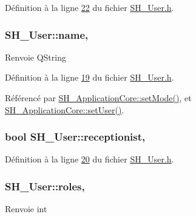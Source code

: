Définition à la ligne \hyperlink{SH__User_8h_source_l00022}{22} du fichier \hyperlink{SH__User_8h_source}{S\-H\-\_\-\-User.\-h}.

\hypertarget{classSH__User_ae32b20d52e62ec32c1f335006f52214e}{
\subsubsection[{name}]{\setlength{\rightskip}{0pt plus 5cm}S\-H\-\_\-\-User\-::name\hspace{0.3cm}{\ttfamily [read]}, {\ttfamily [inherited]}}}\label{classSH__User_ae32b20d52e62ec32c1f335006f52214e}
\begin{DoxyReturn}{Renvoie}
Q\-String 
\end{DoxyReturn}


Définition à la ligne \hyperlink{SH__User_8h_source_l00019}{19} du fichier \hyperlink{SH__User_8h_source}{S\-H\-\_\-\-User.\-h}.



Référencé par \hyperlink{classSH__ApplicationCore_a2bfe19528b27831332559d5d2cd24d25}{S\-H\-\_\-\-Application\-Core\-::set\-Mode()}, et \hyperlink{classSH__ApplicationCore_a2dd5c029a2ea348f1dfd0a60dea476e4}{S\-H\-\_\-\-Application\-Core\-::set\-User()}.

\hypertarget{classSH__User_ad9970fff1a6be03101fd87f9c60081ee}{
\subsubsection[{receptionist}]{\setlength{\rightskip}{0pt plus 5cm}bool S\-H\-\_\-\-User\-::receptionist\hspace{0.3cm}{\ttfamily [read]}, {\ttfamily [inherited]}}}\label{classSH__User_ad9970fff1a6be03101fd87f9c60081ee}


Définition à la ligne \hyperlink{SH__User_8h_source_l00020}{20} du fichier \hyperlink{SH__User_8h_source}{S\-H\-\_\-\-User.\-h}.

\hypertarget{classSH__User_af21eafacfa21aa325f7e68a065ce14de}{
\subsubsection[{roles}]{\setlength{\rightskip}{0pt plus 5cm}S\-H\-\_\-\-User\-::roles\hspace{0.3cm}{\ttfamily [read]}, {\ttfamily [inherited]}}}\label{classSH__User_af21eafacfa21aa325f7e68a065ce14de}
\begin{DoxyReturn}{Renvoie}
int 
\end{DoxyReturn}


